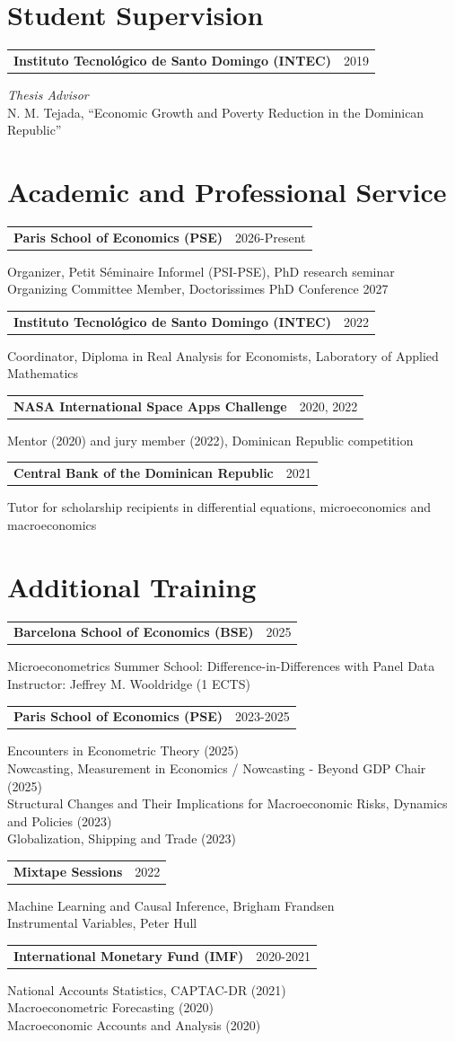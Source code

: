 \documentclass[a4paper,11pt]{article}
\makeatletter
\newcommand{\entry}[3]{%
  \begin{minipage}{\linewidth}
  \begin{tabularx}{\linewidth}{@{}>{\raggedright\arraybackslash}X@{\hspace{12pt}}r@{}}
  \textbf{#1}&{\small #2}\\
  \end{tabularx}\par
  #3\par\end{minipage}\par\vspace{6pt}}
\makeatother
\begin{document}
\section{Student Supervision}
\entry{Instituto Tecnol\'ogico de Santo Domingo (INTEC)}{2019}{%
\textit{Thesis Advisor}\\
N. M. Tejada, ``Economic Growth and Poverty Reduction in the Dominican Republic''}

\section{Academic and Professional Service}
\entry{Paris School of Economics (PSE)}{2026-Present}{%
Organizer, Petit S\'eminaire Informel (PSI-PSE), PhD research seminar\\
Organizing Committee Member, Doctorissimes PhD Conference 2027}
\entry{Instituto Tecnol\'ogico de Santo Domingo (INTEC)}{2022}{%
Coordinator, Diploma in Real Analysis for Economists, Laboratory of Applied Mathematics}
\entry{NASA International Space Apps Challenge}{2020, 2022}{%
Mentor (2020) and jury member (2022), Dominican Republic competition}
\entry{Central Bank of the Dominican Republic}{2021}{%
Tutor for scholarship recipients in differential equations, microeconomics and macroeconomics}

\section{Additional Training}
\entry{Barcelona School of Economics (BSE)}{2025}{%
Microeconometrics Summer School: Difference-in-Differences with Panel Data\\
Instructor: Jeffrey M. Wooldridge (1 ECTS)}
\entry{Paris School of Economics (PSE)}{2023-2025}{%
Encounters in Econometric Theory (2025)\\
Nowcasting, Measurement in Economics / Nowcasting - Beyond GDP Chair (2025)\\
Structural Changes and Their Implications for Macroeconomic Risks, Dynamics and Policies (2023)\\
Globalization, Shipping and Trade (2023)}
\entry{Mixtape Sessions}{2022}{%
Machine Learning and Causal Inference, Brigham Frandsen\\
Instrumental Variables, Peter Hull}
\entry{International Monetary Fund (IMF)}{2020-2021}{%
National Accounts Statistics, CAPTAC-DR (2021)\\
Macroeconometric Forecasting (2020)\\
Macroeconomic Accounts and Analysis (2020)}
\end{document}
